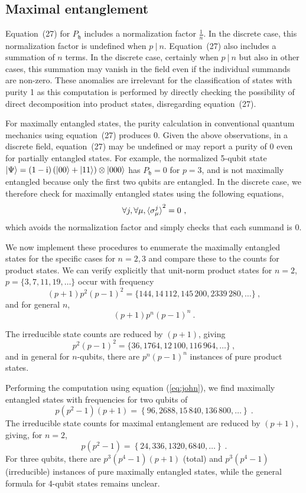 \documentclass[12pt]{iopart}
\def\fh{\mathfrak{h}}
\begin{document}
\subsection{Maximal entanglement}

Equation~(27) for $P_{\fh}$ includes a normalization factor $\frac{1}{n}$. In the discrete case, this normalization factor is undefined when $p ~|~ n$. Equation~(27) also includes a summation of $n$ terms. In the discrete case, certainly when $p ~|~ n$ but also in other cases, this summation may vanish in the field even if the individual summands are non-zero. These anomalies are irrelevant for the classification of states with purity 1 as this computation is performed by directly checking the possibility of direct decomposition into product states, disregarding equation~(27). 

For maximally entangled states, the purity calculation in conventional quantum mechanics using equation~(27) produces 0. Given the above observations, in a discrete field, equation~(27) may be undefined or may report a purity of 0 even for partially entangled states. For example, the normalized 5-qubit state $\ket{\Psi}=\left(1-\mathrm{i}\right)\left(\ket{00}+\ket{11}\right)\otimes\ket{000}$ has $P_{\fh}=0$ for $p=3$, and is not maximally entangled because only the first two qubits are entangled. In the discrete case, we therefore check for maximally entangled states using the following equations,
\begin{equation}
\forall j,\forall\mu,\braket{\sigma_{\mu}^{j}}^2 =0\textrm{ ,}\label{eq:john}
\end{equation}
which avoids the normalization factor and simply checks that each summand is 0. 

We now implement these procedures to enumerate the maximally entangled states for the specific cases for $n = 2 ,3 $ and compare these to the counts for product states. We can verify explicitly that unit-norm product states for $n=2$,
$p=\{3,7,11,19,\ldots\}$ occur with frequency 
\[
(p+1)p^{2}(p-1)^{2}=\{144,14\,112,145\,200,2339\,280,\ldots\}\ ,
\]
and for general $n$, \[(p+1)p^{n}(p-1)^{n}\ .\]

The irreducible state counts are reduced by $(p+1)$, giving 
\[
p^{2}(p-1)^{2}=\{36,1764,12\,100,116\,964,\ldots\}\ ,
\]
and in general for $n$-qubits, there are $p^{n}\left(p-1\right)^{n}$
instances of pure product states.

Performing the computation using equation (\ref{eq:john}), we find maximally entangled states with
frequencies for two qubits of 
\[
p\left(p^2-1\right)\left(p+1\right)=\left\{ 96,2688,15\,840,136\,800,\ldots\right\} \ .
\]
The irreducible state counts for maximal entanglement are reduced
by $\left(p+1\right)$, giving, for $n=2$, 
\[
p\left(p^{2}-1\right)=\left\{ 24,336,1320,6840,\ldots\right\} \ .
\]
For three qubits, there are $p^{3}\left(p^{4}-1\right)\left(p+1\right)$ (total) and $p^{3}\left(p^{4}-1\right)$ (irreducible) instances of pure maximally entangled states, while the general formula for 4-qubit states remains unclear.
\end{document}
